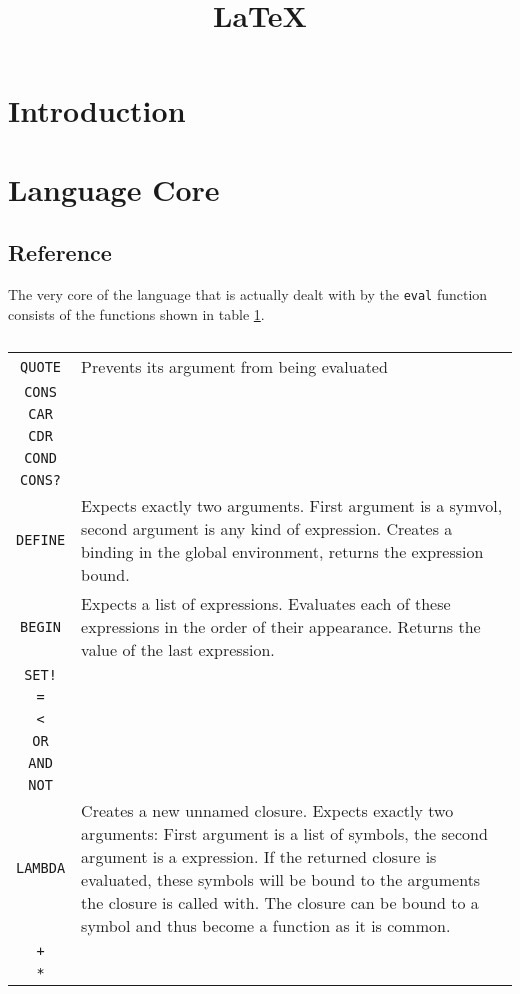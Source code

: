 \documentclass[12pt]{article}
\title{\LaTeX}
\date{}
\begin{document}

\section{Introduction}



\section{Language Core}

\subsection{Reference}

The very core of the language that is actually dealt with by the \texttt{eval}
function consists of the functions shown in table \ref{tbl:CoreFunctions}.

\begin{table}[h]
    \centering
    \begin{tabular}{c|l}
        \texttt{QUOTE} & Prevents its argument from being evaluated \\
        \texttt{CONS} & \\
        \texttt{CAR} & \\
        \texttt{CDR} & \\
        \texttt{COND} & \\
        \texttt{CONS?} & \\
        \texttt{DEFINE} & Expects exactly two arguments. First argument is a
        symvol, second argument is any kind of expression. Creates a binding in
        the global environment, returns the expression bound.\\
        \texttt{BEGIN} & Expects a list of expressions. Evaluates each of these
        expressions in the order of their appearance. Returns the value of the last
        expression. \\
        \texttt{SET!} & \\
        \texttt{=} & \\
        \texttt{<} & \\
        \texttt{OR} & \\
        \texttt{AND} & \\
        \texttt{NOT} & \\
        \texttt{LAMBDA} & Creates a new unnamed closure. Expects exactly two
        arguments: First argument is a list of symbols, the second argument is a
        expression. If the returned closure is evaluated, these symbols will be
        bound to the arguments the closure is called with. The closure can be
        bound to a symbol and thus become a function as it is common.\\
        \texttt{+} & \\
        \texttt{*} & 
    \end{tabular}
    \caption{\label{tbl:CoreFunctions}}
\end{table}
\end{document}
